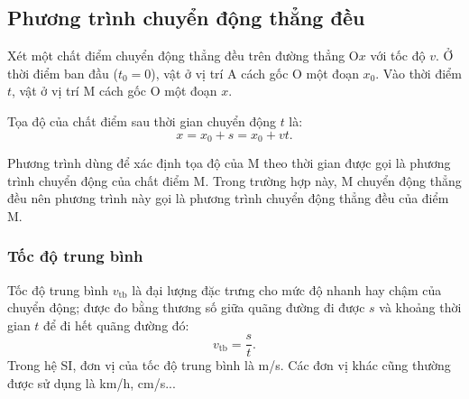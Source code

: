 \subsection{Phương trình chuyển động thẳng đều}
Xét một chất điểm chuyển động thẳng đều trên đường thẳng O$x$ với tốc độ $v$. Ở thời điểm ban đầu ($t_0=0$), vật ở vị trí A cách gốc O một đoạn $x_0$. Vào thời điểm $t$, vật ở vị trí M cách gốc O một đoạn $x$.  
	\begin{center}
\end{center}

Tọa độ của chất điểm sau thời gian chuyển động $t$ là:
\begin{equation}
	x=x_0+s=x_0+vt.
\end{equation}

Phương trình dùng để xác định tọa độ của M theo thời gian được gọi là phương trình chuyển động của chất điểm M. Trong trường hợp này, M chuyển động thẳng đều nên phương trình này gọi là phương trình chuyển động thẳng đều của điểm M. 
\subsubsection{Tốc độ trung bình}
Tốc độ trung bình $v_{\text{tb}}$ là đại lượng đặc trưng cho mức độ nhanh hay chậm của chuyển động; được đo bằng thương số giữa quãng đường đi được $s$ và khoảng thời gian $t$ để đi hết quãng đường đó:
\begin{equation}
	v_{\text{tb}}=\dfrac{s}{t}.
\end{equation}
Trong hệ SI, đơn vị của tốc độ trung bình là m/s. Các đơn vị khác cũng thường được sử dụng là km/h, cm/s...
